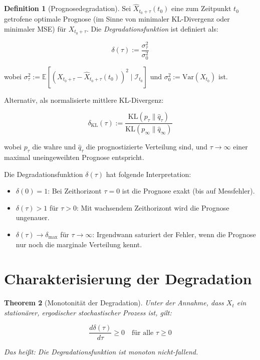 \documentclass[12pt, a4paper, titlepage]{report}
\newtheorem{theorem}{Theorem}[section]
\theoremstyle{definition}
\newtheorem{definition}[theorem]{Definition}
\theoremstyle{remark}
\newcommand{\E}{\mathbb{E}}
\newcommand{\Var}{\mathrm{Var}}
\newcommand{\KL}{\mathrm{KL}}
\begin{document}
\begin{definition}[Prognosedegradation]
Sei $\hat{X}_{t_0+\tau}(t_0)$ eine zum Zeitpunkt $t_0$ getrofene optimale Prognose (im Sinne von minimaler KL-Divergenz oder minimaler MSE) für $X_{t_0+\tau}$. Die \emph{Degradationsfunktion} ist definiert als:

\begin{equation}
\delta(\tau) := \frac{\sigma_\tau^2}{\sigma_0^2}
\label{eq:degradation}
\end{equation}

wobei $\sigma_\tau^2 := \E[(X_{t_0+\tau} - \hat{X}_{t_0+\tau}(t_0))^2 \mid \mathcal{I}_{t_0}]$ und $\sigma_0^2 := \Var(X_{t_0})$ ist.

Alternativ, als normalisierte mittlere KL-Divergenz:

\begin{equation}
\delta_{\KL}(\tau) := \frac{\KL(p_\tau \parallel \hat{q}_\tau)}{\KL(p_\infty \parallel \hat{q}_\infty)}
\label{eq:degradation_kl}
\end{equation}

wobei $p_\tau$ die wahre und $\hat{q}_\tau$ die prognostizierte Verteilung sind, und $\tau \to \infty$ einer maximal uneingeweihten Prognose entspricht.
\end{definition}

Die Degradationsfunktion $\delta(\tau)$ hat folgende Interpretation:
\begin{itemize}
  \item $\delta(0) = 1$: Bei Zeithorizont $\tau=0$ ist die Prognose exakt (bis auf Messfehler).
  \item $\delta(\tau) > 1$ für $\tau > 0$: Mit wachsendem Zeithorizont wird die Prognose ungenauer.
  \item $\delta(\tau) \to \delta_{\max}$ für $\tau \to \infty$: Irgendwann saturiert der Fehler, wenn die Prognose nur noch die marginale Verteilung kennt.
\end{itemize}

\section{Charakterisierung der Degradation}

\begin{theorem}[Monotonität der Degradation]
\label{thm:monotone}
Unter der Annahme, dass $X_t$ ein stationärer, ergodischer stochastischer Prozess ist, gilt:

\begin{equation}
\frac{d\delta(\tau)}{d\tau} \geq 0 \quad \text{für alle } \tau \geq 0
\end{equation}

Das heißt: Die Degradationsfunktion ist monoton nicht-fallend.
\end{theorem}
\end{document}

